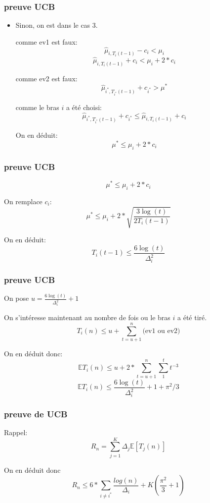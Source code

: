 \documentclass{beamer}
\begin{document}
\begin{frame}
    \frametitle{preuve UCB}
    
    \begin{itemize}
        \item Sinon, on est dans le cas 3.
            
            comme ev1 est faux:
            $$\hat{\mu}_{i,T_i(t-1)} - c_i < \mu_i $$
            $$\hat{\mu}_{i,T_i(t-1)} + c_i < \mu_i + 2 * c_i  $$

            comme ev2 est faux:
            $$\hat{\mu}_{i^*,T_{i^*}(t-1)} + c_{i^*} > \mu^* $$

            comme le bras $i$ a été choisi:
            $$\hat{\mu}_{i^*,T_{i^*}(t-1)} +  c_{i^*} \le \hat{\mu}_{i,T_i(t-1)} + c_i  $$

            On en déduit:
            $$\mu^* \le \mu_i + 2*c_i $$


    \end{itemize}

\end{frame}

\begin{frame}
    \frametitle{preuve UCB}
            $$\mu^* \le \mu_i + 2*c_i $$


            On remplace $c_i$:
            $$\mu^* \le \mu_i + 2* \sqrt{\frac{3\log(t)}{2T_i(t-1)}}$$

            On en déduit:
            $$ T_i(t-1) \le \frac{6\log(t)}{\Delta_i^2} $$
    
\end{frame}

\begin{frame}
    \frametitle{preuve UCB}
    
    On pose $u=  \frac{6\log(t)}{\Delta_i^2}+1 $

    On s'intéresse maintenant au nombre de fois ou le bras $i$ a été tiré.
    $$ T_i(n) \le u + \sum_{t=u+1}^n \mbox{(ev1 ou ev2)} $$

    On en déduit donc:
    $$ \mathbb{E}T_i(n) \le u + 2*\sum_{t=u+1}^n \sum_1^t t^{-3} $$
    $$ \mathbb{E}T_i(n) \le \frac{6\log(t)}{\Delta_i^2}+1 + \pi^2/3  $$

\end{frame}

\begin{frame}
    \frametitle{preuve de UCB}
    Rappel:
    $$R_n=\sum_{j=1}^{K} \Delta_j \mathbb{E} [T_j(n)]$$

    On en déduit donc 
    $$ R_n \le 6*\sum_{i \ne i^*}\frac{log(n)}{\Delta_i} + K(\frac{\pi^2}{3}+1) $$

\end{frame}
\end{document}
